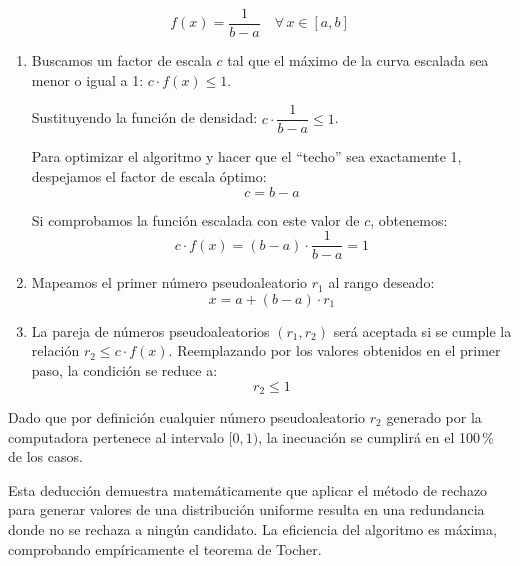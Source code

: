 \documentclass{article}
\begin{document}
\begin{equation}
    f(x) = \frac{1}{b - a} \quad \forall\, x \in [a, b]
\end{equation}

\begin{enumerate}
    \item Buscamos un factor de escala $c$ tal que el máximo de la curva escalada sea
          menor o igual a 1: $c \cdot f(x) \leq 1$.

          Sustituyendo la función de densidad: $c \cdot \dfrac{1}{b-a} \leq 1$.

          Para optimizar el algoritmo y hacer que el ``techo'' sea exactamente 1,
          despejamos el factor de escala óptimo:
          \begin{equation}
              c = b - a
          \end{equation}

          Si comprobamos la función escalada con este valor de $c$, obtenemos:
          \begin{equation}
              c \cdot f(x) = (b - a) \cdot \frac{1}{b - a} = 1
          \end{equation}

    \item Mapeamos el primer número pseudoaleatorio $r_1$ al rango deseado:
          \begin{equation}
              x = a + (b - a) \cdot r_1
          \end{equation}

    \item La pareja de números pseudoaleatorios $(r_1, r_2)$ será aceptada si se cumple
          la relación $r_2 \leq c \cdot f(x)$. Reemplazando por los valores obtenidos en el
          primer paso, la condición se reduce a:
          \begin{equation}
              r_2 \leq 1
          \end{equation}
\end{enumerate}

Dado que por definición cualquier número pseudoaleatorio $r_2$ generado por la computadora
pertenece al intervalo $[0, 1)$, la inecuación se cumplirá en el 100\,\% de los casos.

Esta deducción demuestra matemáticamente que aplicar el método de rechazo para
generar valores de una distribución uniforme resulta en una redundancia donde no se
rechaza a ningún candidato. La eficiencia del algoritmo es máxima, comprobando
empíricamente el teorema de Tocher.
\end{document}
